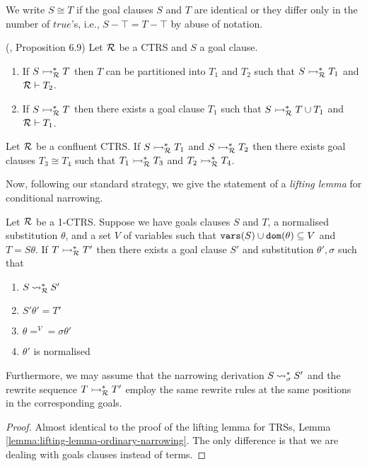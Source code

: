 We write $S \cong T$ if the goal clauses $S$ and $T$ are identical or they differ only in the number of $true$'s, i.e., $S - \top = T - \top$ by  abuse of notation.

\begin{proposition}(\cite{Middeldorp1994}, Proposition 6.9)
	Let $\mathcal{R}$ be a CTRS and $S$ a goal clause.
	\begin{enumerate}
		\item If $S \rightarrowtail^*_{\mathcal{R}} T$ then $T$ can be partitioned into $T_1$ and $T_2$ such that $S \rightarrowtail^*_{\mathcal{R}} T_1$ and $\mathcal{R} \vdash T_2$.
		\item If $S \rightarrowtail^*_{\mathcal{R}} T$ then there exists a goal clause $T_1$ such that $S \rightarrowtail^*_{\mathcal{R}} T \cup T_1$ and $\mathcal{R} \vdash T_1$.
	\end{enumerate}
\end{proposition}

\begin{lemma}
	Let $\mathcal{R}$ be a confluent CTRS. If $S \rightarrowtail^*_{\mathcal{R}} T_1$ and $S \rightarrowtail^*_{\mathcal{R}} T_2$ then there exists goal clauses $T_3 \cong T_4$ such that $T_1 \rightarrowtail^*_{\mathcal{R}} T_3$ and $T_2 \rightarrowtail^*_{\mathcal{R}} T_4$.
\end{lemma}

Now, following our standard strategy, we give the statement of a \textit{lifting lemma} for conditional narrowing.

\begin{lemma}\label{lemma:lifting-lemma-conditional-narrowing}
	Let $\mathcal{R}$ be a 1-CTRS. Suppose we have goals clauses $S$ and $T$, a normalised substitution $\theta$, and a set $V$ of variables such that $\mathtt{vars}(S) \cup \mathtt{dom}(\theta) \subseteq V$ and $T = S \theta$. If $T \rightarrowtail^*_{\mathcal{R}} T'$ then there exists a goal clause $S'$ and substitution $\theta', \sigma$ such that
	\begin{enumerate}
		\item $S \mathbin{\rightsquigarrow}^*_{\mathcal{R}} S'$
		\item $S'\theta' = T'$
		\item $\theta =^V = \sigma\theta'$
		\item $\theta'$ is normalised
	\end{enumerate}
	Furthermore, we may assume that the narrowing derivation $S \mathbin{\rightsquigarrow}^*_\sigma S'$ and the rewrite sequence $T \rightarrowtail^*_{\mathcal{R}} T'$ employ the same rewrite rules at the same positions in the corresponding goals.
	\begin{proof}
		Almost identical to the proof of the lifting lemma for TRSs, Lemma \ref{lemma:lifting-lemma-ordinary-narrowing}. The only difference is that we are dealing with goals clauses instead of terms.
	\end{proof}
\end{lemma}

